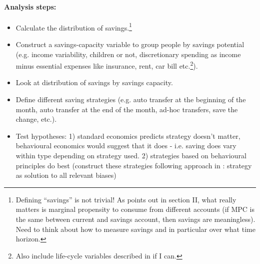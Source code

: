 \documentclass[a4paper, 11pt]{report}
\begin{document}
\paragraph{Analysis steps:}
\begin{itemize}
	\item Calculate the distribution of savings.\footnote{Defining ``savings'' is not trivial! As \citet{thaler1994psychology} points out in section II, what really matters is marginal propensity to consume from different accounts (if MPC is the same between current and savings account, then savings are meaningless). Need to think about how to measure savings and in particular over what time horizon.}

	\item Construct a savings-capacity variable to group people by savings potential (e.g. income variability, children or not, discretionary spending as income minus essential expenses like insurance, rent, car bill etc.\footnote{Also include life-cycle variables described in \citet{ameriks2003wealth} if I can.}).

	\item Look at distribution of savings by savings capacity.

	\item Define different saving strategies (e.g. auto transfer at the beginning of the month, auto transfer at the end of the month, ad-hoc transfers, save the change, etc.).

	\item Test hypotheses: 1) standard economics predicts strategy doesn't matter, behavioural economics would suggest that it does - i.e. saving does vary within type depending on strategy used. 2) strategies based on behavioural principles do best (construct these strategies following approach in \citet{thaler2004save}: strategy as solution to all relevant biases)
\end{itemize}
\end{document}
